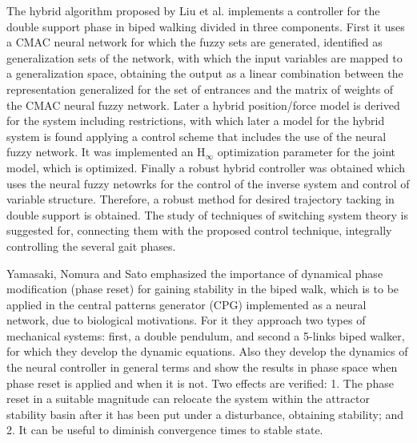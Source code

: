 The hybrid algorithm proposed by Liu et al. \cite{Liu03Hybrid} implements a controller for the double support phase in biped walking divided in three components. First it uses a CMAC neural network for which the fuzzy sets are generated, identified as generalization sets of the network, with which the input variables are mapped to a generalization space, obtaining the output as a linear combination between the representation generalized for the set of entrances and the matrix of weights of the CMAC neural fuzzy  network. Later a hybrid position/force model is derived for the system including restrictions, with which later a model for the hybrid system is found applying a control scheme that includes the use of the neural fuzzy network. It was implemented an H$_\infty$ optimization parameter for the joint model, which is optimized. Finally a robust hybrid controller was obtained which uses the neural fuzzy netowrks for the control of the inverse system and control of variable structure.  Therefore, a robust method for desired trajectory tacking in double support is obtained. The study of techniques of switching system theory is suggested for, connecting them with the proposed control technique, integrally controlling the several gait phases.


Yamasaki, Nomura and Sato \cite{Yamasaki03Possible} emphasized the importance of dynamical phase modification (phase reset) for gaining stability in the biped walk, which is to be applied in the central patterns generator (CPG) implemented as a neural network, due to biological motivations. For it they approach two types of mechanical systems: first, a double pendulum, and second a 5-links biped walker, for which they develop the dynamic equations. Also they develop the dynamics of the neural controller in general terms and show the results in phase space when phase reset is applied and when it is not. Two effects are verified: 1. The phase reset in a suitable magnitude can relocate the system within the attractor stability basin after it has been put under a disturbance, obtaining stability; and 2. It can be useful to diminish convergence times to stable state.


